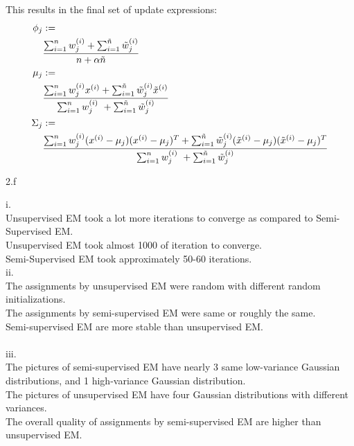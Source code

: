 \begin{answer}
    This results in the final set of update expressions:
    \begin{align*}
      \phi_j & := \\
      & \frac{ \sum_{i=1}^{n} w_j^{(i)} + \sum_{i=1}^{\tilde{{n}}}\tilde{w}_j^{(i)}} { {n} + \alpha \tilde{{n}}} \\
      \mu_j & :=  \\
      & \frac{\sum_{i=1}^{n}  w^{(i)}_jx^{(i)} + \sum_{i=1}^{\tilde{{n}}}\tilde{w}^{(i)}_j\tilde{x}^{(i)}} {\sum_{i=1}^{n}  w^{(i)}_j\ + \sum_{i=1}^{\tilde{{n}}}\tilde{w}^{(i)}_j} \\
      \Sigma_j & :=  \\
      & \frac{ \sum_{i=1}^{n} w^{(i)}_j(x^{(i)} - \mu_j) (x^{(i)} - \mu_j)^T + \sum_{i=1}^{\tilde{{n}}} \tilde{w}^{(i)}_j (\tilde{x}^{(i)} - \mu_j) (\tilde{x}^{(i)} - \mu_j)^T} {\sum_{i=1}^{n}  w^{(i)}_j\ + \sum_{i=1}^{\tilde{{n}}}\tilde{w}^{(i)}_j}
    \end{align*}
  \end{answer}
\clearpage

\LARGE
2.f
\normalsize

  \begin{answer}
    i. \\
    Unsupervised EM took a lot more iterations to converge as compared to Semi-Supervised EM. \\ 
    Unsupervised EM took almost 1000 of iteration to converge. \\
    Semi-Supervised EM took approximately 50-60 iterations. \\

ii. \\
The assignments by unsupervised EM were random with different random initializations. \\
The assignments by semi-supervised EM were same or roughly the same.  \\ 
Semi-supervised EM are more stable than unsupervised EM. \\
\\

iii. \\
The pictures of semi-supervised EM have nearly 3 same low-variance Gaussian distributions, and 1 high-variance Gaussian distribution. \\
The pictures of unsupervised EM have  four Gaussian distributions with different variances. \\
The overall quality of assignments by semi-supervised EM are higher than unsupervised EM. \\

  \end{answer}
\clearpage



